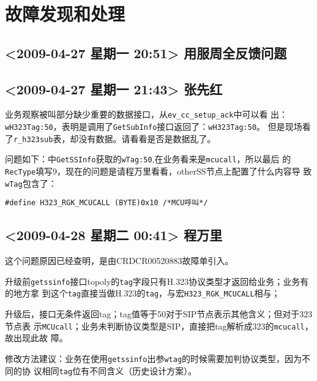 \documentclass[12pt,a4paper,onecolumn]{article}
\begin{document}
\renewcommand\contentsname{\center{印度AIRCEL版本话单类型故障分析}}

\tableofcontents
\pagebreak

\section{故障发现和处理}
\subsection{<2009-04-27 星期一 20:51> 用服周全反馈问题}

\subsection{<2009-04-27 星期一 21:43> 张先红}

业务观察被叫部分缺少重要的数据接口，从\lstinline{ev_cc_setup_ack}中可以看
出：\lstinline{wH323Tag:50}，表明是调用了\lstinline{GetSubInfo}接口返回了：\lstinline{wH323Tag:50}。
但是现场看了\lstinline{r_h323sub}表，却没有数据。请看看是否是数据乱了。

问题如下：中\lstinline{GetSSInfo}获取的\lstinline{wTag:50},在业务看来是\lstinline{mcucall}，所以最后
的\lstinline{RecType}填写9，现在的问题是请程万里看看，otherSS节点上配置了什么内容导
致\lstinline{wTag}包含了：

\begin{footnotesize}
\begin{lstlisting}
#define H323_RGK_MCUCALL (BYTE)0x10 /*MCU呼叫*/
\end{lstlisting}
\end{footnotesize}

\subsection{<2009-04-28 星期二 00:41> 程万里}

这个问题原因已经查明，是由CRDCR00520883故障单引入。

升级前\lstinline{getssinfo}接口topoly的\lstinline{tag}字段只有H.323协议类型才返回给业务；业务有的地方拿
到这个\lstinline{tag}直接当做H.323的\lstinline{tag}，与宏\lstinline{H323_RGK_MCUCALL}相与；

升级后，接口无条件返回tag；tag值等于50对于SIP节点表示其他含义；但对于323节点表
示\lstinline{MCUcall}；业务未判断协议类型是SIP，直接把tag解析成323的\lstinline{mcucall}，故出现此故
障。

修改方法建议：业务在使用\lstinline{getssinfo}出参\lstinline{wtag}的时候需要加判协议类型，因为不同的协
议相同\lstinline{tag}位有不同含义（历史设计方案）。
\end{document}
